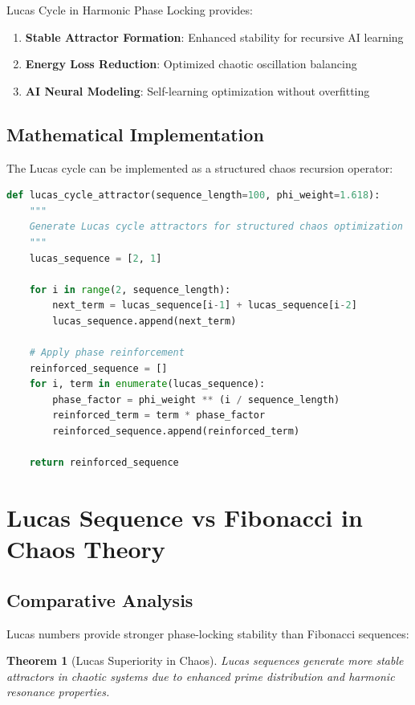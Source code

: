 \documentclass[12pt]{article}
\newtheorem{theorem}{Theorem}
\begin{document}
Lucas Cycle in Harmonic Phase Locking provides:

\begin{enumerate}
\item \textbf{Stable Attractor Formation}: Enhanced stability for recursive AI learning
\item \textbf{Energy Loss Reduction}: Optimized chaotic oscillation balancing
\item \textbf{AI Neural Modeling}: Self-learning optimization without overfitting
\end{enumerate}

\subsection{Mathematical Implementation}

The Lucas cycle can be implemented as a structured chaos recursion operator:

\begin{lstlisting}[language=Python, caption=Lucas Cycle Implementation]
def lucas_cycle_attractor(sequence_length=100, phi_weight=1.618):
    """
    Generate Lucas cycle attractors for structured chaos optimization
    """
    lucas_sequence = [2, 1]

    for i in range(2, sequence_length):
        next_term = lucas_sequence[i-1] + lucas_sequence[i-2]
        lucas_sequence.append(next_term)

    # Apply phase reinforcement
    reinforced_sequence = []
    for i, term in enumerate(lucas_sequence):
        phase_factor = phi_weight ** (i / sequence_length)
        reinforced_term = term * phase_factor
        reinforced_sequence.append(reinforced_term)

    return reinforced_sequence
\end{lstlisting}

\section{Lucas Sequence vs Fibonacci in Chaos Theory}

\subsection{Comparative Analysis}

Lucas numbers provide stronger phase-locking stability than Fibonacci sequences:

\begin{theorem}[Lucas Superiority in Chaos]
Lucas sequences generate more stable attractors in chaotic systems due to enhanced prime distribution and harmonic resonance properties.
\end{theorem}
\end{document}
